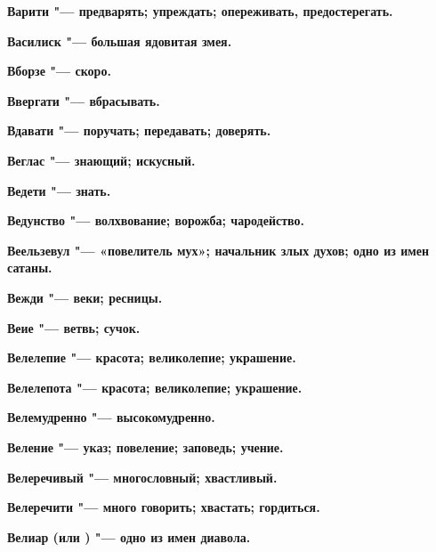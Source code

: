 \begin{multicols}{2}
\bfseries Варити\normalfont{} "--- предварять; упреждать; опереживать, предостерегать. 




\bfseries Василиск\normalfont{} "--- большая ядовитая змея. 




\bfseries Вборзе\normalfont{} "--- скоро. 




\bfseries Ввергати\normalfont{} "--- вбрасывать. 




\bfseries Вдавати\normalfont{} "--- поручать; передавать; доверять. 




\bfseries Веглас\normalfont{} "--- знающий; искусный. 




\bfseries Ведети\normalfont{} "--- знать. 




\bfseries Ведунство\normalfont{} "--- волхвование; ворожба; чародейство. 




\bfseries Веельзевул\normalfont{} "--- «повелитель мух»; начальник злых духов; одно из имен сатаны. 




\bfseries Вежди\normalfont{} "--- веки; ресницы. 




\bfseries Веие\normalfont{} "--- ветвь; сучок. 




\bfseries Велелепие\normalfont{} "--- красота; великолепие; украшение. 




\bfseries Велелепота\normalfont{} "--- красота; великолепие; украшение. 




\bfseries Велемудренно\normalfont{} "--- высокомудренно. 




\bfseries Веление\normalfont{} "--- указ; повеление; заповедь; учение. 




\bfseries Велеречивый\normalfont{} "--- многословный; хвастливый. 




\bfseries Велеречити\normalfont{} "--- много говорить; хвастать; гордиться. 




\bfseries Велиар\normalfont{} (или \normalfont{}) "--- одно из имен диавола. 





\end{multicols}
